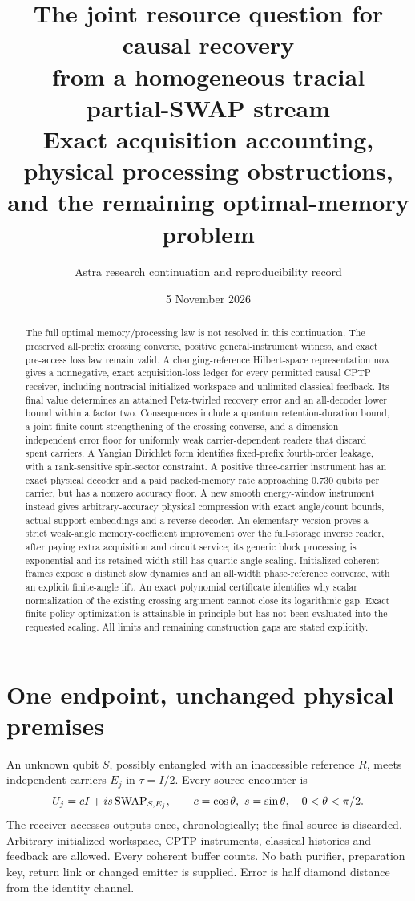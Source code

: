 \documentclass[11pt,a4paper]{article}
\title{\vspace{-1em}The joint resource question for causal recovery\\from a homogeneous tracial partial-SWAP stream\\[.5em]\large Exact acquisition accounting, physical processing obstructions,\\and the remaining optimal-memory problem}
\author{Astra research continuation and reproducibility record}
\date{5 November 2026}
\begin{document}
\maketitle
\begin{abstract}
The full optimal memory/processing law is not resolved in this continuation.
The preserved all-prefix crossing converse, positive general-instrument witness,
and exact pre-access loss law remain valid. A changing-reference Hilbert-space
representation now gives a nonnegative, exact acquisition-loss ledger for every
permitted causal CPTP receiver, including nontracial initialized workspace and
unlimited classical feedback. Its final value determines an attained Petz-twirled
recovery error and an all-decoder lower bound within a factor two. Consequences
include a quantum retention-duration bound, a joint finite-count strengthening of
the crossing converse, and a dimension-independent error floor for uniformly weak
carrier-dependent readers that discard spent carriers. A Yangian Dirichlet form
identifies fixed-prefix fourth-order leakage, with a rank-sensitive spin-sector
constraint. A positive three-carrier instrument has an exact physical decoder
and a paid packed-memory rate approaching 0.730 qubits per carrier, but has a
nonzero accuracy floor. A new smooth energy-window instrument instead gives
arbitrary-accuracy physical compression with exact angle/count bounds, actual
support embeddings and a reverse decoder. An elementary version proves a strict
weak-angle memory-coefficient improvement over the full-storage inverse reader,
after paying extra acquisition and circuit service; its generic block processing
is exponential and its retained width still has quartic angle scaling.
Initialized coherent frames expose a distinct slow dynamics and an all-width
phase-reference converse, with an explicit finite-angle lift. An exact polynomial
certificate identifies why scalar normalization of the existing crossing argument
cannot close its logarithmic gap. Exact finite-policy optimization is attainable
in principle but has not been
evaluated into the requested scaling. All limits and remaining construction
gaps are stated explicitly.
\end{abstract}

\section{One endpoint, unchanged physical premises}
An unknown qubit $S$, possibly entangled with an inaccessible reference $R$, meets
independent carriers $E_j$ in $\tau=I/2$. Every source encounter is
\[
 U_j=cI+is\SWAP_{S,E_j},\qquad c=\cos\theta,\ s=\sin\theta,\quad0<\theta<\pi/2.
\]
The receiver accesses outputs once, chronologically; the final source is
discarded. Arbitrary initialized workspace, CPTP instruments, classical histories
and feedback are allowed. Every coherent buffer counts. No bath purifier,
preparation key, return link or changed emitter is supplied. Error is half
diamond distance from the identity channel.
\end{document}

